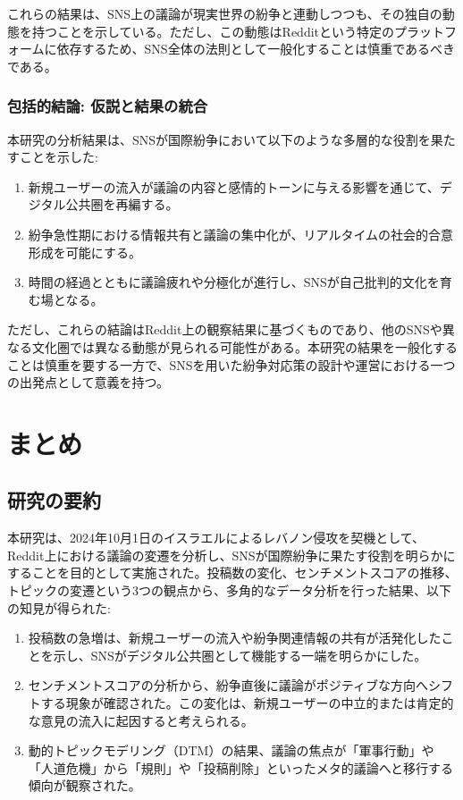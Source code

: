 \documentclass[11pt, a4j]{jreport}
\begin{document}
    これらの結果は、SNS上の議論が現実世界の紛争と連動しつつも、その独自の動態を持つことを示している。ただし、この動態はRedditという特定のプラットフォームに依存するため、SNS全体の法則として一般化することは慎重であるべきである。

    \subsection{包括的結論: 仮説と結果の統合}
    本研究の分析結果は、SNSが国際紛争において以下のような多層的な役割を果たすことを示した:
    \begin{enumerate}
        \item 新規ユーザーの流入が議論の内容と感情的トーンに与える影響を通じて、デジタル公共圏を再編する。
        \item 紛争急性期における情報共有と議論の集中化が、リアルタイムの社会的合意形成を可能にする。
        \item 時間の経過とともに議論疲れや分極化が進行し、SNSが自己批判的文化を育む場となる。
    \end{enumerate}

    ただし、これらの結論はReddit上の観察結果に基づくものであり、他のSNSや異なる文化圏では異なる動態が見られる可能性がある。本研究の結果を一般化することは慎重を要する一方で、SNSを用いた紛争対応策の設計や運営における一つの出発点として意義を持つ。

    \chapter{まとめ}

    \section{研究の要約}
    本研究は、2024年10月1日のイスラエルによるレバノン侵攻を契機として、Reddit上における議論の変遷を分析し、SNSが国際紛争に果たす役割を明らかにすることを目的として実施された。投稿数の変化、センチメントスコアの推移、トピックの変遷という3つの観点から、多角的なデータ分析を行った結果、以下の知見が得られた:

    \begin{enumerate}
        \item 投稿数の急増は、新規ユーザーの流入や紛争関連情報の共有が活発化したことを示し、SNSがデジタル公共圏として機能する一端を明らかにした。
        \item センチメントスコアの分析から、紛争直後に議論がポジティブな方向へシフトする現象が確認された。この変化は、新規ユーザーの中立的または肯定的な意見の流入に起因すると考えられる。
        \item 動的トピックモデリング（DTM）の結果、議論の焦点が「軍事行動」や「人道危機」から「規則」や「投稿削除」といったメタ的議論へと移行する傾向が観察された。
    \end{enumerate}
\end{document}
